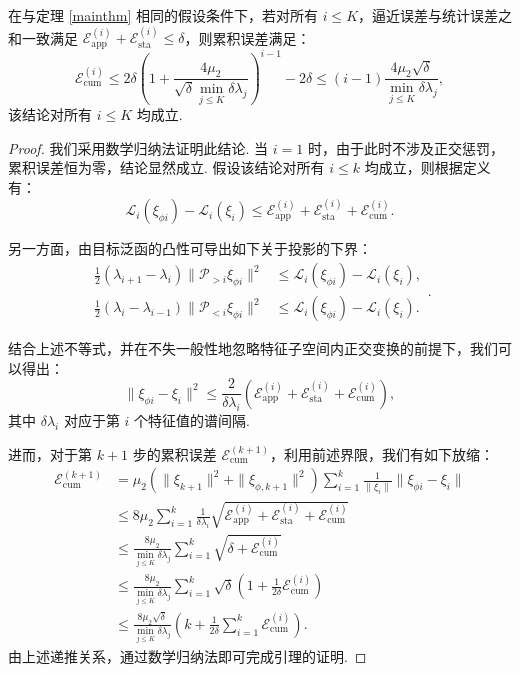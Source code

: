 \begin{lemma}[累计误差]\label{lemma:cumerror}
在与定理 \ref{mainthm} 相同的假设条件下，若对所有 $i \leq K$，逼近误差与统计误差之和一致满足 $\mathcal{E}^{(i)}_{\text{app}} + \mathcal{E}^{(i)}_{\text{sta}} \leq \delta$，则累积误差满足：
$$\mathcal{E}^{(i)}_{\text{cum}} \leq 2\delta\left(1+\frac{4\mu_2}{\sqrt{\delta}\min\limits_{j\leq K}\delta \lambda_{j}}\right)^{i-1}-2\delta \leq (i-1)\frac{4\mu_{2}\sqrt{\delta}}{\min\limits_{j\leq K}\delta \lambda_{j}},$$
该结论对所有 $i \leq K$ 均成立.
\end{lemma}
\begin{proof}
我们采用数学归纳法证明此结论.
当 $i=1$ 时，由于此时不涉及正交惩罚，累积误差恒为零，结论显然成立.
假设该结论对所有 $i \leq k$ 均成立，则根据定义有：
$$\mathcal{L}_{i}(\xi_{\phi i}) - \mathcal{L}_{i}(\xi_{i}) \leq \mathcal{E}^{(i)}_{\text{app}} + \mathcal{E}^{(i)}_{\text{sta}} + \mathcal{E}^{(i)}_{\text{cum}}.$$

另一方面，由目标泛函的凸性可导出如下关于投影的下界：
$$\begin{aligned}
\frac{1}{2}(\lambda_{i+1}-\lambda_{i})\|\mathcal{P}_{>i}\xi_{\phi i}\|^2 &\leq \mathcal{L}_{i}(\xi_{\phi i})-\mathcal{L}_{i}(\xi_{i}),\\ \frac{1}{2}(\lambda_{i}-\lambda_{i-1})\|\mathcal{P}_{<i}\xi_{\phi i}\|^2 &\leq \mathcal{L}_{i}(\xi_{\phi i})-\mathcal{L}_{i}(\xi_{i}).
\end{aligned}.$$

结合上述不等式，并在不失一般性地忽略特征子空间内正交变换的前提下，我们可以得出：
$$\|\xi_{\phi i}-\xi_{i}\|^{2} \leq \frac{2}{\delta \lambda_{i}}\left(\mathcal{E}^{(i)}_{\text{app}} + \mathcal{E}^{(i)}_{\text{sta}} + \mathcal{E}^{(i)}_{\text{cum}}\right),$$
其中 $\delta \lambda_i$ 对应于第 $i$ 个特征值的谱间隔.

进而，对于第 $k+1$ 步的累积误差 $\mathcal{E}_{\text{cum}}^{(k+1)}$，利用前述界限，我们有如下放缩：
$$\begin{aligned}
\mathcal{E}_{\text{cum}}^{(k+1)} &= \mu_2(\|\xi_{k+1}\|^2+\|\xi_{\phi, k+1}\|^2)\sum\limits_{i=1}^{k}\frac{1}{\|\xi_i\|}\|\xi_{\phi i}-\xi_{i}\| \\
&\leq 8\mu_2\sum\limits_{i=1}^{k}\frac{1}{\delta \lambda_{i}}\sqrt{\mathcal{E}^{(i)}_{\text{app}}+\mathcal{E}^{(i)}_{\text{sta}}+\mathcal{E}^{(i)}_{\text{cum}}} \\
&\leq \frac{8\mu_2}{\min\limits_{j\leq K}\delta \lambda_{j}}\sum\limits_{i=1}^{k}\sqrt{\delta+\mathcal{E}^{(i)}_{\text{cum}}} \\
&\leq \frac{8\mu_2}{\min\limits_{j\leq K}\delta \lambda_{j}}\sum\limits_{i=1}^{k}\sqrt{\delta}\left(1+\frac{1}{2\delta}\mathcal{E}^{(i)}_{\text{cum}}\right) \\
&\leq \frac{8\mu_2 \sqrt{\delta}}{\min\limits_{j\leq K}\delta \lambda_{j}}\left(k+\frac{1}{2\delta}\sum\limits_{i=1}^{k}\mathcal{E}^{(i)}_{\text{cum}}\right).
\end{aligned}$$
由上述递推关系，通过数学归纳法即可完成引理的证明.
\end{proof}


